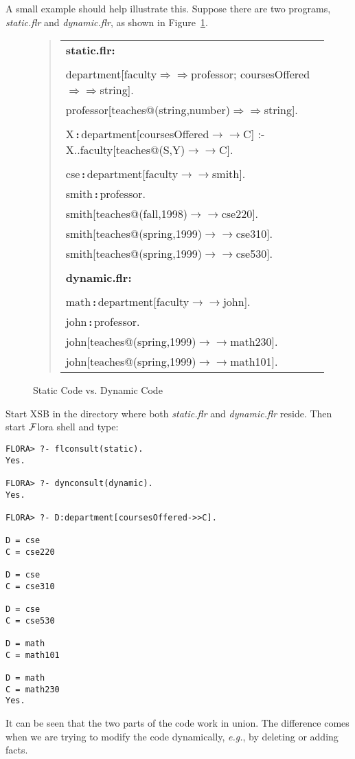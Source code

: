 \documentclass[11pt]{article}
\newcommand{\isa}{\,{\bf{:}}\,}
\newcommand{\mvd}{\ensuremath{{\rightarrow\!\!\!\!\rightarrow}}}  %
\newcommand{\Mvd}{\ensuremath{{\Rightarrow\!\!\!\!\Rightarrow}}}  %
\newcommand{\FLORA}{{\mbox{${\cal F}${\sc lora}}}\xspace}
\begin{document}
A small example should help illustrate this. Suppose there are two
programs, {\it static.flr} and {\it dynamic.flr}, as shown in
Figure~\ref{fig:fig-static-dynamic-code}.
\begin{figure}[htb]
\begin{quote}
\begin{tabular}{l}
{\bf static.flr:}\\ \\
department[faculty{\Mvd}professor; coursesOffered{\Mvd}string]. \\
professor[teaches@(string,number){\Mvd}string]. \\
\\
X{\isa}department[coursesOffered{\mvd}C] :-
	X..faculty[teaches@(S,Y){\mvd}C]. \\ \\

cse{\isa}department[faculty{\mvd}smith]. \\
smith{\isa}professor. \\
smith[teaches@(fall,1998){\mvd}cse220]. \\
smith[teaches@(spring,1999){\mvd}cse310]. \\
smith[teaches@(spring,1999){\mvd}cse530]. \\
\\
{\bf dynamic.flr:}\\ \\
math{\isa}department[faculty{\mvd}john]. \\
john{\isa}professor. \\
john[teaches@(spring,1999){\mvd}math230]. \\
john[teaches@(spring,1999){\mvd}math101].
\end{tabular}
\end{quote}
\caption{Static Code vs. Dynamic Code} \label{fig:fig-static-dynamic-code}
\end{figure}
Start XSB in the directory where both \emph{static.flr} and
\emph{dynamic.flr} reside. Then start \FLORA shell and type:
\begin{verbatim}
FLORA> ?- flconsult(static).
Yes.

FLORA> ?- dynconsult(dynamic).
Yes.

FLORA> ?- D:department[coursesOffered->>C].

D = cse
C = cse220

D = cse
C = cse310

D = cse
C = cse530

D = math
C = math101

D = math
C = math230
Yes.
\end{verbatim}
It can be seen that the two parts of the code work in union. The difference
comes when we are trying to modify the code dynamically, {\it e.g.}, by
deleting or adding facts.
\end{document}
